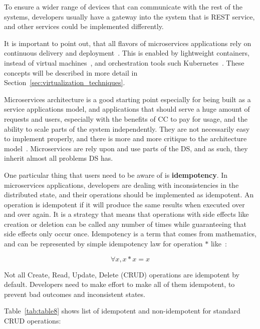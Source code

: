 \noindent
To ensure a wider range of devices that can communicate with the rest of the systems, developers usually have a gateway into the system that is REST service, and other services could be implemented differently.

It is important to point out, that all flavors of microservices applications rely on continuous delivery and deployment~\cite{7436659}. This is enabled by lightweight containers, instead of virtual machines~\cite{FelterFRR15}, and orchestration tools such Kubernetes~\cite{BurnsGOBW16}. These concepts will be described in more detail in Section~\ref{sec:virtualization_techniques}.

Microservices architecture is a good starting point especially for being built as a service applications model, and applications that should serve a huge amount of requests and users, especially with the benefits of CC to pay for usage, and the ability to scale parts of the system independently.  They are not necessarily easy to implement properly, and there is more and more critique to the architecture model~\cite{SoldaniTH18}. Microservices are rely upon and use parts of the DS, and as such, they inherit almost all problems DS has. 

One particular thing that users need to be aware of is \textbf{idempotency}. In microservices applications, developers are dealing with inconsistencies in the distributed state, and their operations should be implemented as idempotent. An operation is idempotent if it will produce the same results when executed over and over again. It is a strategy that means that operations with side effects like creation or deletion can be called any number of times while guaranteeing that side effects only occur once. Idempotency is a term that comes from mathematics, and can be represented by simple idempotency law for operation $*$ like~\cite{gratzer2002general}:

\begin{equation}\label{form:idempotency_law}
	\forall x, x * x = x
\end{equation}

\noindent
Not all Create, Read, Update, Delete (CRUD) operations are idempotent by default. Developers need to make effort to make all of them idempotent, to prevent bad outcomes and inconsistent states. 

Table~\ref{tab:table8} shows list of idempotent and non-idempotent for standard CRUD operations:

